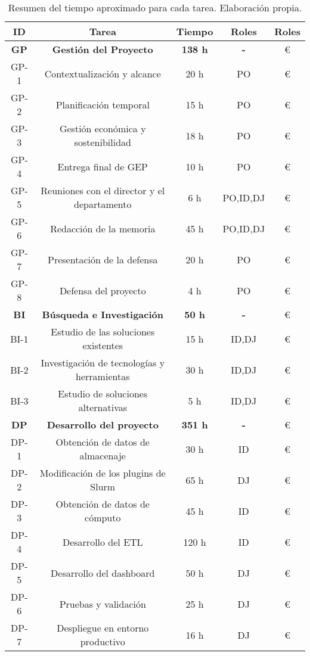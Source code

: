 \begin{table}[H]
    \centering
    \begin{tabular}{|c|c|c|c|c|}
        \hline
        \textbf{ID} & \textbf{Tarea} & \textbf{Tiempo} & \textbf{Roles} & \textbf{Roles}\\
        \hline
        \textbf{GP} & \textbf{Gestión del Proyecto} & \textbf{138 h} & \textbf{-}  & € \\
        \hline
        GP-1 & Contextualización y alcance & 20 h &  PO  & € \\
        GP-2 & Planificación temporal & 15 h &  PO  & € \\
        GP-3 & Gestión económica y sostenibilidad & 18 h &  PO  & € \\
        GP-4 & Entrega final de GEP & 10 h &  PO  & € \\
        GP-5 & Reuniones con el director y el departamento & 6 h &  PO,ID,DJ  & € \\
        GP-6 & Redacción de la memoria & 45 h & PO,ID,DJ & € \\
        GP-7 & Presentación de la defensa & 20 h &  PO  & € \\
        GP-8 & Defensa del proyecto & 4 h &  PO & € \\
        \hline
        \textbf{BI} & \textbf{Búsqueda e Investigación} & \textbf{50 h} & \textbf{-} & € \\
        \hline
        BI-1 & Estudio de las soluciones existentes & 15 h & ID,DJ & € \\
        BI-2 & Investigación de tecnologías y herramientas & 30 h & ID,DJ & € \\
        BI-3 & Estudio de soluciones alternativas & 5 h & ID,DJ & € \\
        \hline
        \textbf{DP} & \textbf{Desarrollo del proyecto} & \textbf{351 h} & \textbf{-} & € \\
        \hline
        DP-1 & Obtención de datos de almacenaje & 30 h & ID & € \\
        DP-2 & Modificación de los plugins de Slurm & 65 h & DJ & € \\
        DP-3 & Obtención de datos de cómputo & 45 h & ID & € \\
        DP-4 & Desarrollo del ETL & 120 h & ID & € \\
        DP-5 & Desarrollo del dashboard & 50 h & DJ & € \\
        DP-6 & Pruebas y validación & 25 h & DJ & € \\
        DP-7 & Despliegue en entorno productivo & 16 h & DJ & € \\
        \hline
    \end{tabular}
    \caption{Resumen del tiempo aproximado para cada tarea. Elaboración propia.}
    \label{tab:estimaciones}
\end{table}